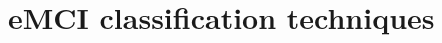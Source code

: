 \documentclass[journal]{IEEEtran}
\begin{document}
	
	
	
	
	
	
	
	\section{eMCI classification techniques}
	
\end{document}
